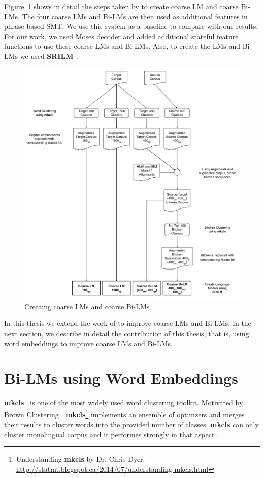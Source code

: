Figure~\ref{fig:baseline} shows in detail the steps taken by \cite{Stewart2014} to create coarse LM and coarse Bi-LMs. The four coarse LMs and Bi-LMs are then used as additional features in phrase-based SMT. We use this system as a baseline to compare with our results. For our work, we used Moses decoder \cite{Koehn2007Moses} and added additional stateful feature functions to use these coarse LMs and Bi-LMs. Also, to create the LMs and Bi-LMs we used \textbf{SRILM}~\cite{Srilm}.

\begin{figure}[htbp]
	\begin{center}
		\includegraphics[width=\textwidth]{files/images/baseline}
	\end{center}
	\caption{Creating coarse LMs and coarse Bi-LMs \cite{Stewart2014}}
	\label{fig:baseline}
\end{figure}

In this thesis we extend the work of \cite{Stewart2014} to improve coarse LMs and Bi-LMs. In the next section, we describe in detail the contribution of this thesis, that is, using word embeddings to improve coarse LMs and Bi-LMs.

\section{Bi-LMs using Word Embeddings}
\textbf{mkcls}~\cite{Och1995} is one of the most widely used word clustering toolkit. Motivated by Brown Clustering \cite{Brown1992}, \textbf{mkcls}\footnote{Understanding \textbf{mkcls} by Dr. Chris Dyer: \url{http://statmt.blogspot.ca/2014/07/understanding-mkcls.html}} implements an ensemble of optimzers and merges their results to cluster words into the provided number of classes. \textbf{mkcls} can only cluster monolingual corpus and it performes strongly in that aspect \cite{Blunsom2011}.

